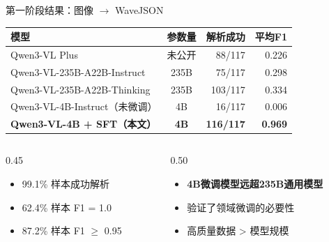 \documentclass[aspectratio=169,10pt]{beamer}
\begin{document}
\begin{frame}{第一阶段结果：图像 $\to$ WaveJSON}
\centering
\small
\begin{tabular}{lcrr}
  \toprule
  模型 & 参数量 & 解析成功 & 平均F1 \\
  \midrule
  Qwen3-VL Plus & 未公开 & 88/117 & 0.226 \\
  Qwen3-VL-235B-A22B-Instruct & 235B & 75/117 & 0.298 \\
  Qwen3-VL-235B-A22B-Thinking & 235B & 103/117 & 0.334 \\
  \midrule
  Qwen3-VL-4B-Instruct（未微调） & 4B & 16/117 & 0.006 \\
  \textbf{Qwen3-VL-4B + SFT（本文）} & \textbf{4B} & \textbf{116/117} & \textbf{0.969} \\
  \bottomrule
\end{tabular}

\vspace{0.8em}
\begin{columns}[T]
\begin{column}{0.45\textwidth}
\begin{itemize}
  \item 99.1\% 样本成功解析
  \item 62.4\% 样本 F1 = 1.0
  \item 87.2\% 样本 F1 $\geq$ 0.95
\end{itemize}
\end{column}
\begin{column}{0.50\textwidth}
\begin{itemize}
  \item \textbf{4B微调模型远超235B通用模型}
  \item 验证了领域微调的必要性
  \item 高质量数据 > 模型规模
\end{itemize}
\end{column}
\end{columns}
\end{frame}
\end{document}
